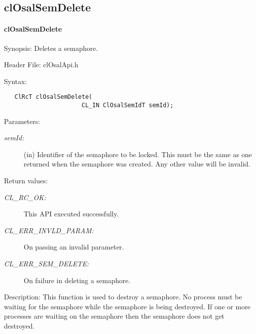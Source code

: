 \subsection{clOsalSemDelete}
\hypertarget{pageosal138}{}\paragraph{cl\-Osal\-Sem\-Delete}\label{pageosal138}
\begin{Desc}
\item[Synopsis:]Deletes a semaphore.\end{Desc}
\begin{Desc}
\item[Header File:]clOsalApi.h\end{Desc}
\begin{Desc}
\item[Syntax:]

\footnotesize\begin{verbatim}   ClRcT clOsalSemDelete(
                      CL_IN ClOsalSemIdT semId);
\end{verbatim}
\normalsize
\end{Desc}
\begin{Desc}
\item[Parameters:]
\begin{description}
\item[{\em sem\-Id:}](in) Identifier of the semaphore to be locked. This must be the same as one returned when the semaphore was created. Any other value will be invalid.\end{description}
\end{Desc}
\begin{Desc}
\item[Return values:]
\begin{description}
\item[{\em CL\_\-RC\_\-OK:}]This API executed successfully. \item[{\em CL\_\-ERR\_\-INVLD\_\-PARAM:}]On passing an invalid parameter. \item[{\em CL\_\-ERR\_\-SEM\_\-DELETE:}]On failure in deleting a semaphore.\end{description}
\end{Desc}
\begin{Desc}
\item[Description:]This function is used to destroy a semaphore. No process must be waiting for the semaphore while the semaphore is being destroyed. If one or more processes are waiting on the semaphore then the semaphore does not get destroyed.\end{Desc}
